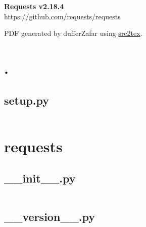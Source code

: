 \documentclass{article}
\begin{document}

\title{}
\author{Shadab Zafar}

\begin{titlepage}
   \begin{center}
    \Huge
    \textbf{Requests v2.18.4} \\


    \LARGE
    \href{https://github.com/requests/requests}{https://github.com/requests/requests}


    \large
    PDF generated by dufferZafar using \href{http://github.com/dufferzafar/src2tex}{src2tex}.
   \end{center}
\end{titlepage}

\newpage

\tableofcontents
\newpage



\section{.}

\subsection{setup.py}
\inputminted{python}{/tmp/requests/setup.py}
\newpage

\section{requests}

\subsection{\_\_init\_\_.py}
\inputminted{python}{/tmp/requests/requests/__init__.py}
\newpage

\subsection{\_\_version\_\_.py}
\inputminted{python}{/tmp/requests/requests/__version__.py}
\newpage
\end{document}
